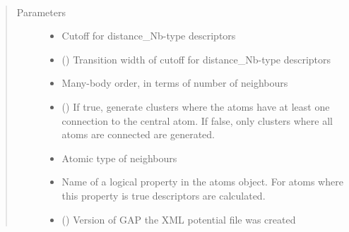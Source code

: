 \documentclass[letterpaper,10pt,english]{sphinxmanual}
\begin{document}

\begin{fulllineitems}
\label{\detokenize{descriptors:gap.descriptors.distance_Nb}}~\begin{quote}\begin{description}
\item[{Parameters}] \leavevmode\begin{itemize}
\item {} 
 \textendash{} Cutoff for distance\_Nb-type descriptors

\item {} 
 () \textendash{} Transition width of cutoff for distance\_Nb-type descriptors

\item {} 
 \textendash{} Many-body order, in terms of number of neighbours

\item {} 
 () \textendash{} If true, generate clusters where the atoms have at least one connection to the central atom. If false, only clusters where all atoms are connected are generated.

\item {} 
 \textendash{} Atomic type of neighbours

\item {} 
 \textendash{} Name of a logical property in the atoms object. For atoms where this property is true descriptors are calculated.

\item {} 
 () \textendash{} Version of GAP the XML potential file was created


\end{itemize}
\end{description}
\end{quote}
\end{fulllineitems}
\end{document}
